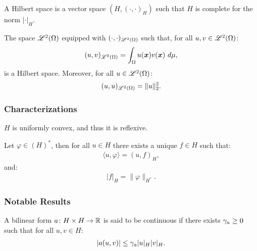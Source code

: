 \begin{definition}
    A Hilbert space is a vector space $(H, (\cdot, \cdot)_H)$ such that $H$ is complete for the norm $\lvert \cdot \rvert_H$.
\end{definition}

\begin{remark}
    The space $\mathscr{L}^{2}(\Omega)$ equipped with $(\cdot, \cdot)_{\mathscr{L}^{2}(\Omega)}$ such that, for all $u, v \in \mathscr{L}^{2}(\Omega)$:
    \begin{gather}
        (u, v)_{\mathscr{L}^{2}(\Omega)} = \int_{\Omega} u(\bm{x}) v(\bm{x}) ~ d \mu,
    \end{gather}
    is a Hilbert space. Moreover, for all $u \in \mathscr{L}^{2}(\Omega)$:
    \begin{gather}
        (u, u)_{\mathscr{L}^{2}(\Omega)} = \lVert u \rVert_2^2.
    \end{gather}
\end{remark}

\subsubsection{Characterizations}

\begin{theorem}
    $H$ is uniformly convex, and thus it is reflexive.
\end{theorem}

\begin{theorem}
    Let $\varphi \in (H)^*$, then for all $u \in H$ there exists a unique $f \in H$ such that:
    \begin{gather}
        \langle u, \varphi \rangle = (u, f)_H,
    \end{gather}
    and:
    \begin{gather}
        \lvert f \rvert_H = \lVert \varphi \rVert_{H^*}.
    \end{gather}
\end{theorem}

\subsubsection{Notable Results}

\begin{definition}
    A bilinear form $a \colon H \times H \rightarrow \mathbb{R}$ is said to be continuous if there exists $\gamma_{a} \geq 0$ such that for all $u, v \in H$:
    \begin{gather}
        \lvert a(u, v) \rvert \leq \gamma_{a} \lvert u \rvert_H \lvert v \rvert_H.
    \end{gather}
\end{definition}

